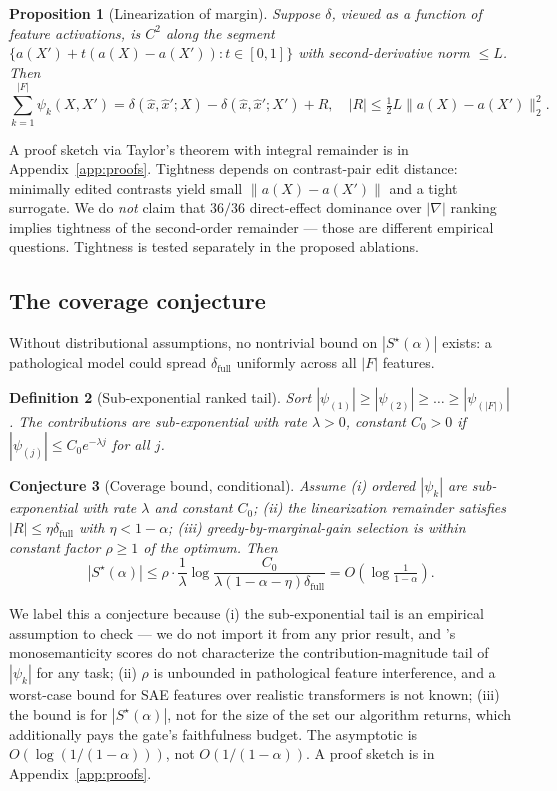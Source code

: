 \documentclass[10pt]{article}
\newtheorem{definition}{Definition}[section]
\newtheorem{proposition}[definition]{Proposition}
\newtheorem{conjecture}[definition]{Conjecture}
\begin{document}
\begin{proposition}[Linearization of margin]
\label{prop:linearization}
Suppose $\delta$, viewed as a function of feature activations, is $C^2$ along the segment $\{a(X') + t(a(X) - a(X')) : t \in [0,1]\}$ with second-derivative norm $\leq L$. Then
\[
\sum_{k=1}^{|F|} \psi_k(X, X') = \delta(\hat x, \hat x'; X) - \delta(\hat x, \hat x'; X') + R, \quad |R| \leq \tfrac{1}{2} L \|a(X) - a(X')\|_2^2.
\]
\end{proposition}

A proof sketch via Taylor's theorem with integral remainder is in Appendix~\ref{app:proofs}. Tightness depends on contrast-pair edit distance: minimally edited contrasts yield small $\|a(X) - a(X')\|$ and a tight surrogate. We do \emph{not} claim that $36/36$ direct-effect dominance over $|\nabla|$ ranking implies tightness of the second-order remainder --- those are different empirical questions. Tightness is tested separately in the proposed ablations.

\subsection{The coverage conjecture}

Without distributional assumptions, no nontrivial bound on $|S^\star(\alpha)|$ exists: a pathological model could spread $\delta_{\text{full}}$ uniformly across all $|F|$ features.

\begin{definition}[Sub-exponential ranked tail]
\label{def:subexp}
Sort $|\psi_{(1)}| \geq |\psi_{(2)}| \geq \dots \geq |\psi_{(|F|)}|$. The contributions are \emph{sub-exponential with rate $\lambda > 0$, constant $C_0 > 0$} if $|\psi_{(j)}| \leq C_0 e^{-\lambda j}$ for all $j$.
\end{definition}

\begin{conjecture}[Coverage bound, conditional]
\label{conj:coverage}
Assume (i) ordered $|\psi_k|$ are sub-exponential with rate $\lambda$ and constant $C_0$; (ii) the linearization remainder satisfies $|R| \leq \eta \delta_{\text{full}}$ with $\eta < 1 - \alpha$; (iii) greedy-by-marginal-gain selection is within constant factor $\rho \geq 1$ of the optimum. Then
\[
|S^\star(\alpha)| \leq \rho \cdot \frac{1}{\lambda} \log \frac{C_0}{\lambda(1 - \alpha - \eta)\delta_{\text{full}}} = O\!\left(\log \tfrac{1}{1-\alpha}\right).
\]
\end{conjecture}

We label this a conjecture because (i) the sub-exponential tail is an empirical assumption to check --- we do not import it from any prior result, and \citet{templeton2024scaling}'s monosemanticity scores do not characterize the contribution-magnitude tail of $|\psi_k|$ for any task; (ii) $\rho$ is unbounded in pathological feature interference, and a worst-case bound for SAE features over realistic transformers is not known; (iii) the bound is for $|S^\star(\alpha)|$, not for the size of the set our algorithm returns, which additionally pays the gate's faithfulness budget. The asymptotic is $O(\log(1/(1-\alpha)))$, not $O(1/(1-\alpha))$. A proof sketch is in Appendix~\ref{app:proofs}.
\end{document}
